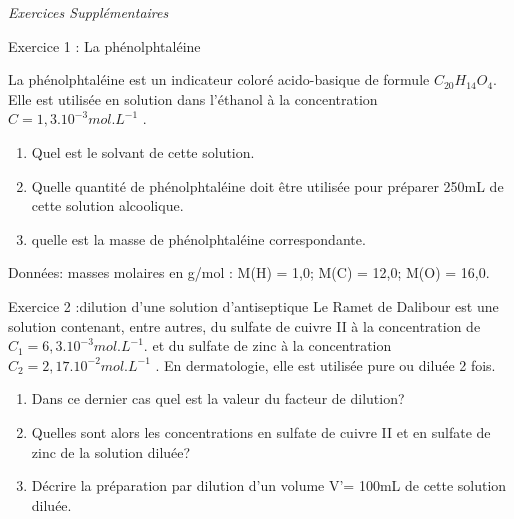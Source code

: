 \documentclass[12pt, french]{article}
\begin{document}
\begin{center}
\end{center}
\begin{center}
   \Large{ \em{Exercices Supplémentaires}}
\end{center}

   \begin{Box2}{Exercice 1 : La phénolphtaléine }


	   La phénolphtaléine est un indicateur coloré acido-basique de formule $C_{20}H_{14}O_4$. Elle est utilisée en
	   solution dans l’éthanol à la concentration $C=1,3.10^{-3}mol.L^{-1}$
.

\begin{enumerate}
	\item Quel est le solvant de cette solution.
	\item  Quelle quantité de phénolphtaléine doit être utilisée pour préparer 250mL de cette solution
alcoolique.
\item  quelle est la masse de phénolphtaléine correspondante.
\end{enumerate}
	Données:
masses molaires en g/mol : M(H) = 1,0; M(C) = 12,0; M(O) = 16,0.

   \end{Box2}


\begin{Box2}{Exercice 2 :dilution d'une solution d'antiseptique}
Le Ramet de Dalibour est une solution contenant, entre autres, du sulfate de cuivre II à la concentration de $C_1=6,3.10^{-3}mol.L^{-1}$. et du sulfate de zinc à la concentration $C_2=2,17.10^{-2} mol.L^{-1}$ . En dermatologie, elle est utilisée pure ou diluée 2 fois.

\begin{enumerate}
\item Dans ce dernier cas quel est la valeur du facteur de dilution?
\item  Quelles sont alors les concentrations en sulfate de cuivre II et en sulfate de zinc de
la solution diluée?
\item  Décrire la préparation par dilution d’un volume V’= 100mL de cette solution diluée.
\end{enumerate}

\end{Box2}
\end{document}
